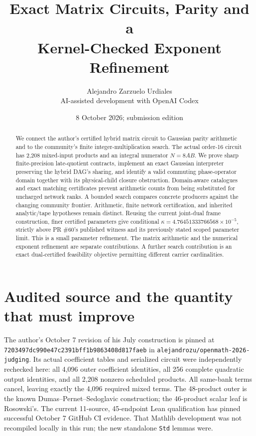 \documentclass[11pt]{article}
\title{Exact Matrix Circuits, Parity and a\\Kernel-Checked Exponent Refinement}
\author{Alejandro Zarzuelo Urdiales\\\small AI-assisted development with OpenAI Codex}
\date{8 October 2026; submission edition}
\begin{document}
\maketitle
\begin{abstract}
We connect the author's certified hybrid matrix circuit to Gaussian parity
arithmetic and to the community's finite integer-multiplication search.
The actual order-16 circuit has 2,208 mixed-input products and an integral
numerator $N=8AB$. We prove sharp finite-precision late-quotient contracts,
implement an exact Gaussian interpreter preserving the hybrid DAG's sharing,
and identify a valid commuting phase-operator domain together with its
physical-child closure obstruction. Domain-aware catalogues and exact
matching certificates prevent arithmetic counts from being substituted for
uncharged network ranks. A bounded search compares concrete producers against
the changing community frontier. Arithmetic, finite network certification,
and inherited analytic/tape hypotheses remain distinct. Reusing the current
joint-dual frame construction, finer certified parameters give conditional
$\kappa=4.76451333766568\times10^{-5}$, strictly above PR \#60's published
witness and its previously stated scoped parameter limit. This is a small
parameter refinement. The matrix arithmetic and the numerical exponent
refinement are separate contributions. A further search contribution is an
exact dual-certified feasibility objective permitting different carrier
cardinalities.
\end{abstract}

\section{Audited source and the quantity that must improve}
The author's October 7 revision of his July construction is pinned at
\texttt{7203497dc990e47c2391bff1b9863408d817faeb} in
\texttt{alejandrozu/openmath-2026-judging}. Its actual coefficient tables and
serialized circuit were independently rechecked here: all 4,096 outer
coefficient identities, all 256 complete quadratic output identities, and
all 2,208 nonzero scheduled products. All same-bank terms cancel, leaving
exactly the 4,096 required mixed terms. The 48-product outer is the known
Dumas--Pernet--Sedoglavic construction; the 46-product scalar leaf is Rosowski's.
The current 11-source, 45-endpoint Lean qualification has pinned successful
October 7 GitHub CI evidence. That Mathlib development was not recompiled
locally in this run; the new standalone \texttt{Std} lemmas were.
\end{document}
